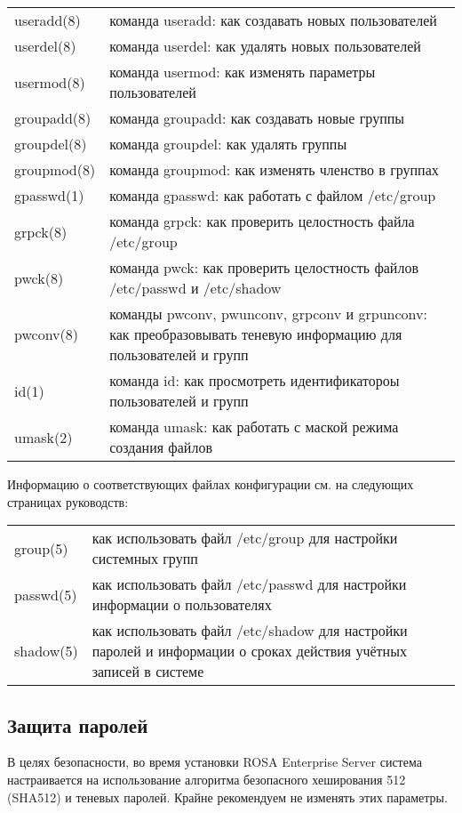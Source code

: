 \documentclass[a4paper,10pt,twoside]{article}
\begin{document}
\begin{longtable}{  m{4cm}  m{10cm}  }
useradd(8) & команда useradd: как создавать новых пользователей\\
userdel(8) & команда userdel: как удалять новых пользователей\\
usermod(8) & команда usermod: как изменять параметры пользователей\\
groupadd(8) & команда groupadd: как создавать новые группы\\
groupdel(8) & команда groupdel: как удалять группы\\
groupmod(8) & команда groupmod: как изменять членство в группах\\
gpasswd(1) & команда gpasswd: как работать с файлом /etc/group\\
grpck(8) & команда grpck: как проверить целостность файла /etc/group\\
pwck(8) & команда pwck:  как проверить целостность файлов /etc/passwd и /etc/shadow\\
pwconv(8) & команды pwconv, pwunconv, grpconv и grpunconv: как преобразовывать теневую информацию для пользователей и групп\\
id(1) & команда id: как просмотреть идентификатороы пользователей и групп\\
umask(2) & команда umask: как работать с маской режима создания файлов\\
\end{longtable}

Информацию о соответствующих файлах конфигурации см. на следующих страницах руководств:
\begin{longtable}{  m{4cm}  m{10cm}  }
group(5) & как использовать файл /etc/group для настройки системных групп\\
passwd(5) & как использовать файл /etc/passwd для настройки информации о пользователях\\
shadow(5) & как использовать файл /etc/shadow для настройки паролей и информации о сроках действия учётных записей в системе\\
\end{longtable}

\subsection{Защита паролей}
В целях безопасности, во время установки ROSA Enterprise Server система настраивается на использование алгоритма безопасного хеширования 512 (SHA512) и теневых паролей. Крайне рекомендуем не изменять этих параметры.
\end{document}
